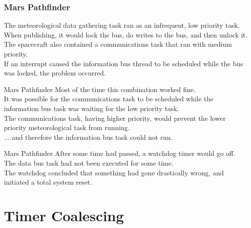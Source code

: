 \documentclass[aspectratio=169]{beamer}
\begin{document}
\begin{frame}
\frametitle{Mars Pathfinder}
The meteorological data gathering task ran as an infrequent, low priority task. \\
\vspace{1em}
When publishing, it would lock the bus, do writes to the bus, and then unlock it. \\
\vspace{1em}
The spacecraft also contained a communications task that ran with medium priority. \\
\vspace{1em}
If an interrupt caused the information bus thread to be scheduled while the bus was locked, the problem occurred. \\
\end{frame}




\begin{frame}{Mars Pathfinder}
Most of the time this combination worked fine.  \\
\vspace{1em}
It was possible for the communications task to be scheduled while the information bus task was waiting for the low priority task.\\
\vspace{1em}
The communications task, having higher priority, would prevent the lower priority meteorological task from running.\\
\quad... and therefore the information bus task could not run.
\end{frame}





\begin{frame}{Mars Pathfinder}
\large
After some time had passed, a watchdog timer would go off. \\
\vspace{1em}
The data bus task had not been executed for some time.  \\
\vspace{1em}
The watchdog concluded that something had gone drastically wrong, and initiated a total system reset.\\
\end{frame}



\section{Timer Coalescing}
\end{document}
